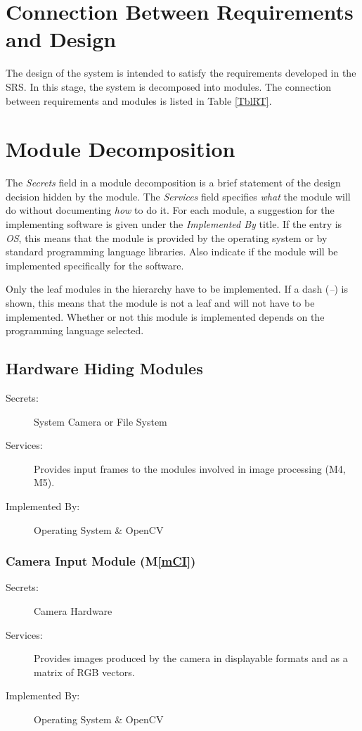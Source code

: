 \documentclass[12pt, titlepage]{article}
\newcommand{\mref}[1]{M\ref{#1}}
\begin{document}
\section{Connection Between Requirements and Design} \label{SecConnection}

The design of the system is intended to satisfy the requirements developed in
the SRS. In this stage, the system is decomposed into modules. The connection
between requirements and modules is listed in Table \ref{TblRT}.

\section{Module Decomposition} \label{SecMD}

The \emph{Secrets} field in a module decomposition is a brief statement of the design decision hidden by the module. 
The \emph{Services} field specifies \emph{what} the module will do without documenting \emph{how} to do it. 
For each module, a suggestion for the implementing software is given under the \emph{Implemented By} title. 
If the entry is \emph{OS}, this means that the module is provided by the operating system or by standard programming language libraries.
Also indicate if the module will be implemented specifically for the software.

Only the leaf modules in the hierarchy have to be implemented. 
If a dash (\emph{--}) is shown, this means that the module is not a leaf and will not have to be implemented. 
Whether or not this module is implemented depends on the programming language selected.

\subsection{Hardware Hiding Modules}

\begin{description}
\item[Secrets:] System Camera or File System
\item[Services:] Provides input frames to the modules involved in image processing (M4, M5).
\item[Implemented By:] Operating System \& OpenCV
\end{description}

\subsubsection{Camera Input Module (\mref{mCI})}
\begin{description}
\item[Secrets:] Camera Hardware
\item[Services:] Provides images produced by the camera in displayable formats and as a matrix of RGB vectors.
\item[Implemented By:] Operating System \& OpenCV
\end{description}
\end{document}
